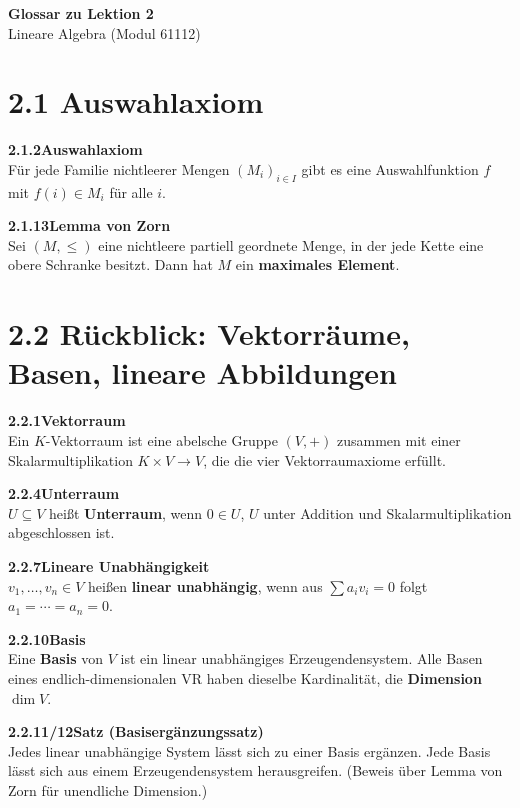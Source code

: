 \documentclass[a4paper,12pt]{article}
\newcommand{\gentry}[3]{%
  \noindent\textbf{#1\quad #2}\nopagebreak\\[0.2em]
  #3\par\smallskip
}
\begin{document}
\begin{center}
  {\LARGE\bfseries Glossar zu Lektion 2}\\[0.5em]
  {\large Lineare Algebra (Modul 61112)}
\end{center}

\vspace{0.8em}

\section*{2.1 \quad Auswahlaxiom}

\gentry{2.1.2}{Auswahlaxiom}{%
  Für jede Familie nichtleerer Mengen $(M_i)_{i \in I}$ gibt es eine Auswahlfunktion $f$ mit $f(i) \in M_i$ für alle $i$.
}

\gentry{2.1.13}{Lemma von Zorn}{%
  Sei $(M, \le)$ eine nichtleere partiell geordnete Menge, in der jede Kette eine obere Schranke besitzt. Dann hat $M$ ein \textbf{maximales Element}.
}

\section*{2.2 \quad Rückblick: Vektorräume, Basen, lineare Abbildungen}

\gentry{2.2.1}{Vektorraum}{%
  Ein $K$-Vektorraum ist eine abelsche Gruppe $(V,+)$ zusammen mit einer Skalarmultiplikation $K \times V \to V$, die die vier Vektorraumaxiome erfüllt.
}

\gentry{2.2.4}{Unterraum}{%
  $U \subseteq V$ heißt \textbf{Unterraum}, wenn $0 \in U$, $U$ unter Addition und Skalarmultiplikation abgeschlossen ist.
}

\gentry{2.2.7}{Lineare Unabhängigkeit}{%
  $v_1, \ldots, v_n \in V$ heißen \textbf{linear unabhängig}, wenn aus $\sum a_i v_i = 0$ folgt $a_1 = \cdots = a_n = 0$.
}

\gentry{2.2.10}{Basis}{%
  Eine \textbf{Basis} von $V$ ist ein linear unabhängiges Erzeugendensystem. Alle Basen eines endlich-dimensionalen VR haben dieselbe Kardinalität, die \textbf{Dimension} $\dim V$.
}

\gentry{2.2.11/12}{Satz (Basisergänzungssatz)}{%
  Jedes linear unabhängige System lässt sich zu einer Basis ergänzen. Jede Basis lässt sich aus einem Erzeugendensystem herausgreifen. (Beweis über Lemma von Zorn für unendliche Dimension.)
}
\end{document}
